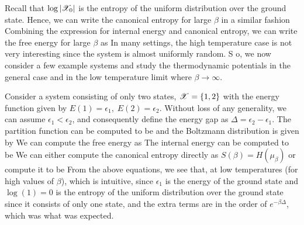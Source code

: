 \documentclass[letterpaper,english,10pt]{article}
\begin{document}
Recall that $\log |\mathscr{X}_0|$ is the entropy of the uniform distribution over the ground state. 
Hence, we can write the canonical entropy for large $\beta$ in a similar fashion 
Combining the expression for internal energy and canonical entropy, we can write the free energy for large $\beta$ as
In many settings, the high temperature case is not very interesting since the system is almost uniformly random. S
o, we now consider a few example systems and study the thermodynamic potentials in the general case and in the low temperature limit where $\beta \to \infty$. 
\begin{shaded*}
\begin{exmp}
Consider a system consisting of only two states, $\mathscr{X} = \{1, 2 \}$ with the energy function given by
$E(1) = \epsilon_1,\; E(2) = \epsilon_2$. 
Without loss of any generality, we can assume $\epsilon_1 < \epsilon_2$, and consequently define the energy gap as $\Delta = \epsilon_2 - \epsilon_1$. 
The partition function can be computed to be 
and the Boltzmann distribution is given by
We can compute the free energy as 
The internal energy can be computed to be 
We can either compute the canonical entropy directly as $S(\beta) = H(\mu_\beta)$ or compute it to be
From the above equations, we see that, at low temperatures (for high values of $\beta$),
which is intuitive, since $\epsilon_1$ is the energy of the ground state and $\log(1) = 0$ is the entropy of the uniform distribution over the ground state since it consists of only one state, and the extra terms are in the order of $e^{-\beta \Delta}$, which was what was expected.
\end{exmp}
\end{shaded*}
\end{document}
